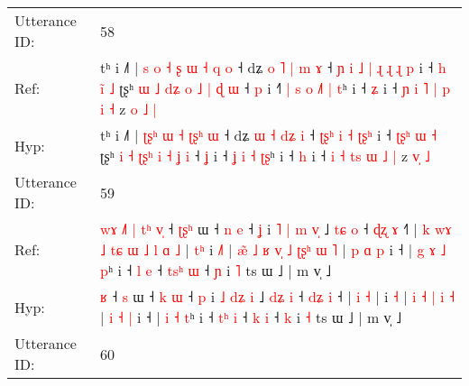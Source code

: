 \documentclass[10pt]{article}
\DeclareRobustCommand{\hl}[1]{{\textcolor{red}{#1}}}
\begin{document}
\begin{longtable}{ll}
 \\
\midrule
Utterance ID: & 58 \\
Ref: & tʰ i ˩˥ |\hl{ }\hl{s} \hl{o}\hl{ }\hl{˧} \hl{ʂ} \hl{ɯ} \hl{˧}\hl{ }\hl{q} \hl{o} ˧ dʑ \hl{o} \hl{˥} \hl{|}\hl{ }\hl{m} \hl{ɤ} ˧\hl{ }\hl{ɲ}\hl{ }\hl{i} \hl{˩}\hl{ }\hl{|} \hl{ɻ} \hl{ɻ} \hl{ɻ}\hl{ }\hl{p} i ˧ \hl{}\hl{h}\hl{ }\hl{i}\hl{̃} \hl{˩} ʈʂʰ \hl{ɯ} \hl{˩} \hl{d}\hl{ʑ}\hl{ }\hl{o} \hl{˩} \hl{|} \hl{ɖ} \hl{ɯ} ˧ \hl{p} i ˧\hl{˥}\hl{ }\hl{|} \hl{s} \hl{o} \hl{˩}\hl{˥} \hl{|}\hl{ }\hl{t}ʰ i ˧ \hl{ʑ} i ˧ \hl{ɲ} \hl{i} \hl{˥}\hl{ }\hl{|} \hl{p} \hl{i} \hl{˧} z \hl{o}\hl{ }\hl{˩} \hl{|}
 \\
Hyp: & tʰ i ˩˥ |\hl{}\hl{} \hl{ʈ}\hl{ʂ}\hl{ʰ} \hl{ɯ} \hl{˧} \hl{ʈ}\hl{ʂ}\hl{ʰ} \hl{ɯ} ˧ dʑ \hl{ɯ} \hl{˧} \hl{}\hl{d}\hl{ʑ} \hl{i} ˧\hl{}\hl{}\hl{}\hl{} \hl{ʈ}\hl{ʂ}\hl{ʰ} \hl{i} \hl{˧} \hl{ʈ}\hl{ʂ}\hl{ʰ} i ˧ \hl{ʈ}\hl{ʂ}\hl{ʰ}\hl{ }\hl{ɯ} \hl{˧} ʈʂʰ \hl{i} \hl{˧} \hl{}\hl{ʈ}\hl{ʂ}\hl{ʰ} \hl{i} \hl{˧} \hl{ʝ} \hl{i} ˧ \hl{ʝ} i ˧\hl{}\hl{}\hl{} \hl{ʝ} \hl{i} \hl{}\hl{˧} \hl{}\hl{ʈ}\hl{ʂ}ʰ i ˧ \hl{h} i ˧ \hl{i} \hl{˧} \hl{}\hl{t}\hl{s} \hl{ɯ} \hl{˩} \hl{|} z \hl{}\hl{v}\hl{̩} \hl{˩}
 \\
\midrule
Utterance ID: & 59 \\
Ref: & \hl{w}\hl{ɤ}\hl{ }\hl{˩}\hl{˥}\hl{ }\hl{|}\hl{ }\hl{t}\hl{ʰ}\hl{ }\hl{v}\hl{̩} ˧ \hl{ʈ}\hl{ʂ}\hl{ʰ} ɯ ˧ \hl{n} \hl{e} ˧ \hl{ʝ} i \hl{˥} \hl{|}\hl{ }\hl{m} \hl{v}\hl{̩} ˩ \hl{t}\hl{ɕ} \hl{o} ˧ \hl{ɖ}\hl{ʐ} \hl{ɤ} ˧\hl{˥} |\hl{ }\hl{k}\hl{ }\hl{w}\hl{ɤ}\hl{ }\hl{˩}\hl{ }\hl{t}\hl{ɕ}\hl{ }\hl{ɯ}\hl{ }\hl{˩}\hl{ }\hl{l} \hl{ɑ} \hl{˩} |\hl{ }\hl{t}\hl{ʰ} i \hl{˩}\hl{˥} |\hl{ }\hl{æ}\hl{̃}\hl{ }\hl{˩}\hl{ }\hl{ʁ} \hl{v}\hl{̩} \hl{˩} \hl{ʈ}\hl{ʂ}\hl{ʰ} \hl{ɯ} \hl{˥} | \hl{p} \hl{ɑ} \hl{p} i ˧ |\hl{ }\hl{g} \hl{ɤ} \hl{˩} \hl{p}ʰ i ˧ \hl{}\hl{l} \hl{e} ˧ \hl{t}\hl{s}\hl{ʰ} \hl{ɯ} ˧ \hl{ɲ} i \hl{˥} ts ɯ ˩ | m v̩ ˩
 \\
Hyp: & \hl{}\hl{}\hl{}\hl{}\hl{}\hl{}\hl{}\hl{}\hl{}\hl{}\hl{}\hl{}\hl{ʁ} ˧ \hl{}\hl{}\hl{s} ɯ ˧ \hl{k} \hl{ɯ} ˧ \hl{p} i \hl{˩} \hl{}\hl{d}\hl{ʑ} \hl{}\hl{i} ˩ \hl{d}\hl{ʑ} \hl{i} ˧ \hl{d}\hl{ʑ} \hl{i} ˧\hl{} |\hl{}\hl{}\hl{}\hl{}\hl{}\hl{}\hl{}\hl{}\hl{}\hl{}\hl{}\hl{}\hl{}\hl{}\hl{}\hl{} \hl{i} \hl{˧} |\hl{}\hl{}\hl{} i \hl{}\hl{˧} |\hl{}\hl{}\hl{}\hl{}\hl{}\hl{}\hl{} \hl{}\hl{i} \hl{˧} \hl{}\hl{}\hl{|} \hl{i} \hl{˧} | \hl{i} \hl{˧} \hl{|} i ˧ |\hl{}\hl{} \hl{i} \hl{˧} \hl{t}ʰ i ˧ \hl{t}\hl{ʰ} \hl{i} ˧ \hl{}\hl{}\hl{k} \hl{i} ˧ \hl{k} i \hl{˧} ts ɯ ˩ | m v̩ ˩
 \\
\midrule
Utterance ID: & 60 \\

\end{longtable}
\end{document}
